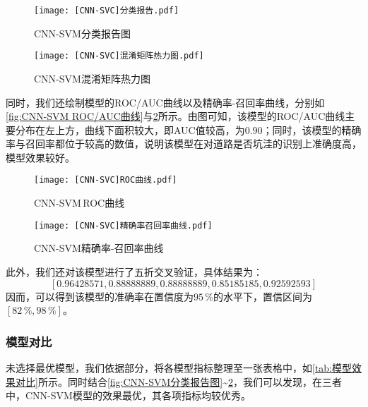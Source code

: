 \documentclass{MathorCupmodeling}
\begin{document}
\begin{itemize}
\begin{figure}[H]
	\centering
	\begin{minipage}{0.48\linewidth}
		\centering
		\texttt{[image: [CNN-SVC]分类报告.pdf]}
		\caption{CNN-SVM分类报告图}
		\label{fig:CNN-SVM分类报告图}
	\end{minipage}
	\begin{minipage}{0.48\linewidth}
		\centering
		\texttt{[image: [CNN-SVC]混淆矩阵热力图.pdf]}
		\caption{CNN-SVM混淆矩阵热力图}
		\label{fig:CNN-SVM混淆矩阵热力图}
	\end{minipage}
\end{figure}

同时，我们还绘制模型的ROC/AUC曲线以及精确率-召回率曲线，分别如\textcolor{blue}{\cref{fig:CNN-SVM ROC/AUC曲线}}与\textcolor{blue}{\cref{fig:CNN-SVM精确率召回率曲线}}所示。由图可知，该模型的ROC/AUC曲线主要分布在左上方，曲线下面积较大，即AUC值较高，为$0.90$；同时，该模型的精确率与召回率都位于较高的数值，说明该模型在对道路是否坑洼的识别上准确度高，模型效果较好。

\begin{figure}[H]
	\centering
	\begin{minipage}{0.48\linewidth}
		\centering
		\texttt{[image: [CNN-SVC]ROC曲线.pdf]}
		\caption{CNN-SVM\,ROC曲线}
		\label{fig:CNN-SVM ROC/AUC曲线}
	\end{minipage}
	\begin{minipage}{0.48\linewidth}
		\centering
		\texttt{[image: [CNN-SVC]精确率召回率曲线.pdf]}
		\caption{CNN-SVM精确率-召回率曲线}
		\label{fig:CNN-SVM精确率召回率曲线}
	\end{minipage}
\end{figure}
	\end{itemize}

	此外，我们还对该模型进行了五折交叉验证，具体结果为：
	\begin{equation}
		\boldsymbol{[0.96428571, 0.88888889, 0.88888889,0.85185185, 0.92592593]}\nonumber
	\end{equation}
	因而，可以得到该模型的准确率在置信度为$95\,\%$的水平下，置信区间为$\left[82\,\%, 98\,\%\right]$。
	\subsubsection{模型对比}
	未选择最优模型，我们依据\textcolor{blue}{}部分，将各模型指标整理至一张表格中，如\textcolor{blue}{\cref{tab:模型效果对比}}所示。同时结合\textcolor{blue}{\cref{fig:CNN-SVM分类报告图}}\textasciitilde\textcolor{blue}{\cref{fig:CNN-SVM精确率召回率曲线}}，我们可以发现，在三者中，CNN-SVM模型的效果最优，其各项指标均较优秀。
\end{document}
